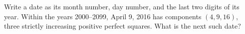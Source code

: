 Write a date as its month number, day number, and the last two digits of its year. Within the years 2000--2099, April 9, 2016 has components $(4,9,16)$, three strictly increasing positive perfect squares. What is the next such date?
